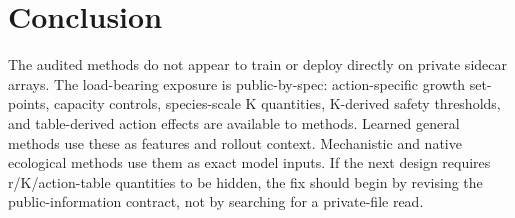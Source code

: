 \documentclass[11pt]{article}
\begin{document}
\section{Conclusion}

The audited methods do not appear to train or deploy directly on private sidecar
arrays. The load-bearing exposure is public-by-spec: action-specific growth
set-points, capacity controls, species-scale K quantities, K-derived safety
thresholds, and table-derived action effects are available to methods. Learned
general methods use these as features and rollout context. Mechanistic and native
ecological methods use them as exact model inputs. If the next design requires
r/K/action-table quantities to be hidden, the fix should begin by revising the
public-information contract, not by searching for a private-file read.
\end{document}
